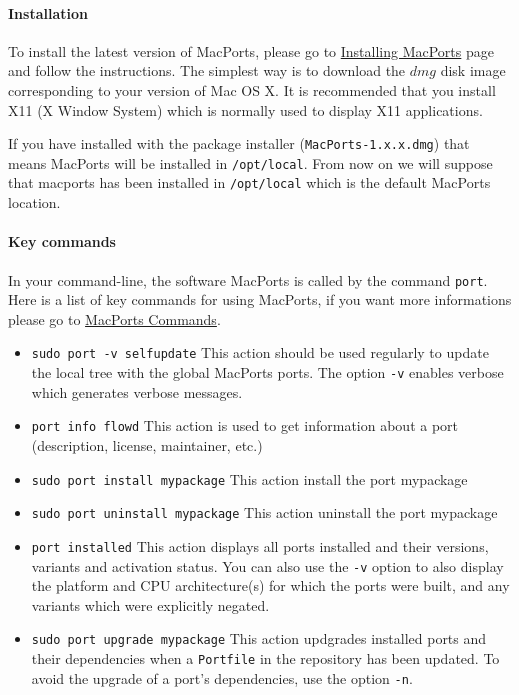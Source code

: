 \paragraph{Installation}
To install the latest version of MacPorts, please go to \href{http://www.macports.org/install.php}{Installing MacPorts} page and follow the instructions. The simplest way is to download the $dmg$ disk image corresponding to your version of Mac OS X. It is recommended that you install X11 (X Window System) which is normally used to display X11 applications.%

If you have installed with the package installer (\verb|MacPorts-1.x.x.dmg|) that means MacPorts will be installed in \verb|/opt/local|. From now on we will suppose that macports has been installed in \verb|/opt/local| which is the default MacPorts location. %

\paragraph{Key commands}
In your command-line, the software MacPorts is called by the command \verb|port|.
Here is a list of key commands for using MacPorts, if you want more informations please go to \href{http://guide.macports.org/#using.port}{MacPorts Commands}.
\begin{itemize}
\item \verb|sudo port -v selfupdate|
	This action should be used regularly to update the local tree with the global MacPorts ports. The option \verb|-v| enables verbose which generates verbose messages.
\item \verb|port info flowd|
	This action is used to get information about a port (description, license, maintainer, etc.)
\item \verb|sudo port install mypackage|
	This action install the port mypackage
\item \verb|sudo port uninstall mypackage|
	This action uninstall the port mypackage
\item \verb|port installed|
	This action displays all ports installed and their versions, variants and activation status. You can also use the \verb|-v| option to also display the platform and CPU architecture(s) for which the ports were built, and any variants which were explicitly negated.
\item \verb|sudo port upgrade mypackage|
	This action updgrades installed ports and their dependencies when a \verb|Portfile| in the repository has been updated. To avoid the upgrade of a port's dependencies, use the option \verb|-n|.
\end{itemize}

